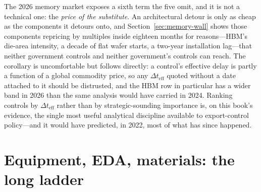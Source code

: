 The 2026 memory market exposes a sixth term the five omit, and it is not a technical one: the \emph{price of the substitute}. An architectural detour is only as cheap as the components it detours onto, and Section~\ref{sec:memory-wall} shows those components repricing by multiples inside eighteen months for reasons---HBM's die-area intensity, a decade of flat wafer starts, a two-year installation lag---that neither government controls and neither government's controls can reach. The corollary is uncomfortable but follows directly: a control's effective delay is partly a function of a global commodity price, so any $\Delta t_{\text{eff}}$ quoted without a date attached to it should be distrusted, and the HBM row in particular has a wider band in 2026 than the same analysis would have carried in 2024. Ranking controls by $\Delta t_{\text{eff}}$ rather than by strategic-sounding importance is, on this book's evidence, the single most useful analytical discipline available to export-control policy---and it would have predicted, in 2022, most of what has since happened.

\section{Equipment, EDA, materials: the long ladder}

